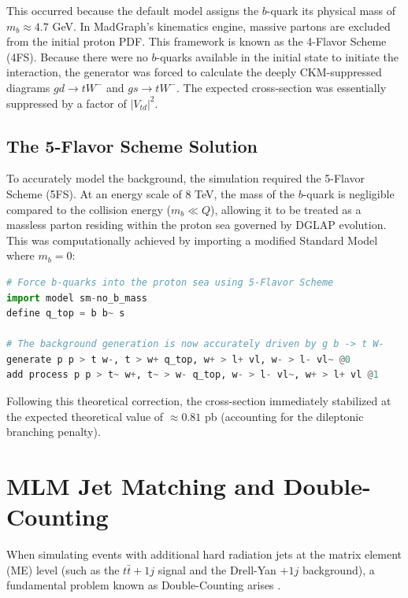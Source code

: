 \documentclass[11pt,a4paper]{article}
\begin{document}
This occurred because the default model assigns the $b$-quark its physical mass of $m_b \approx 4.7$ GeV. In MadGraph's \cite{madgraph} kinematics engine, massive partons are excluded from the initial proton PDF. This framework is known as the 4-Flavor Scheme (4FS). Because there were no $b$-quarks available in the initial state to initiate the interaction, the generator was forced to calculate the deeply CKM-suppressed diagrams $gd \rightarrow tW^{-}$ and $gs \rightarrow tW^{-}$. The expected cross-section was essentially suppressed by a factor of $|V_{td}|^{2}$.

\subsection{The 5-Flavor Scheme Solution}
To accurately model the background, the simulation required the 5-Flavor Scheme (5FS). At an energy scale of 8 TeV, the mass of the $b$-quark is negligible compared to the collision energy ($m_b \ll Q$), allowing it to be treated as a massless parton residing within the proton sea governed by DGLAP evolution. This was computationally achieved by importing a modified Standard Model where $m_b = 0$:

\begin{lstlisting}[language=Python, caption=MadGraph correction for the $tW$ background using 5FS]
# Force b-quarks into the proton sea using 5-Flavor Scheme
import model sm-no_b_mass
define q_top = b b~ s

# The background generation is now accurately driven by g b -> t W-
generate p p > t w-, t > w+ q_top, w+ > l+ vl, w- > l- vl~ @0
add process p p > t~ w+, t~ > w- q_top, w- > l- vl~, w+ > l+ vl @1
\end{lstlisting}
Following this theoretical correction, the cross-section immediately stabilized at the expected theoretical value of $\approx 0.81$ pb (accounting for the dileptonic branching penalty).

\section{MLM Jet Matching and Double-Counting}
When simulating events with additional hard radiation jets at the matrix element (ME) level (such as the $t\bar{t}+1j$ signal and the Drell-Yan $+1j$ background), a fundamental problem known as Double-Counting arises \cite{mlm_matching}.
\end{document}
